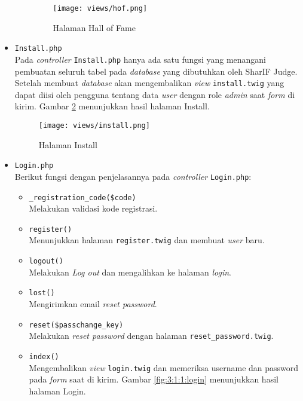 \begin{itemize}
\begin{itemize}
		            \begin{figure}[H]
			            \centering
			            \texttt{[image: views/hof.png]}
			            \caption{Halaman Hall of Fame}
			            \label{fig:3:1:1:hof}
		            \end{figure}

	      \end{itemize}

	\item \verb|Install.php| \\
	      Pada \textit{controller} \verb|Install.php| hanya ada satu fungsi yang menangani pembuatan seluruh tabel pada \textit{database} yang dibutuhkan oleh SharIF Judge. Setelah membuat \textit{database} akan mengembalikan \textit{view} \verb|install.twig| yang dapat diisi oleh pengguna tentang data \textit{user} dengan role \textit{admin} saat \textit{form} di kirim. Gambar \ref{fig:3:1:1:install} menunjukkan hasil halaman Install.

	      \begin{figure}[H]
		      \centering
		      \texttt{[image: views/install.png]}
		      \caption{Halaman Install}
		      \label{fig:3:1:1:install}
	      \end{figure}


	\item \verb|Login.php| \\
	      Berikut fungsi dengan penjelasannya pada \textit{controller} \verb|Login.php|:

	      \begin{itemize}
		      \item \verb|_registration_code($code)| \\
		            Melakukan validasi kode registrasi.
		      \item \verb|register()| \\
		            Menunjukkan halaman \verb|register.twig| dan membuat \textit{user} baru.
		      \item \verb|logout()| \\
		            Melakukan \textit{Log out} dan mengalihkan ke halaman \textit{login}.
		      \item \verb|lost()| \\
		            Mengirimkan email \textit{reset password}.
		      \item \verb|reset($passchange_key)| \\
		            Melakukan \textit{reset password} dengan halaman \verb|reset_password.twig|.
		      \item \verb|index()| \\
		            Mengembalikan \textit{view} \verb|login.twig| dan memeriksa username dan password pada \textit{form} saat di kirim. Gambar \ref{fig:3:1:1:login} menunjukkan hasil halaman Login.


\end{itemize}
\end{itemize}
